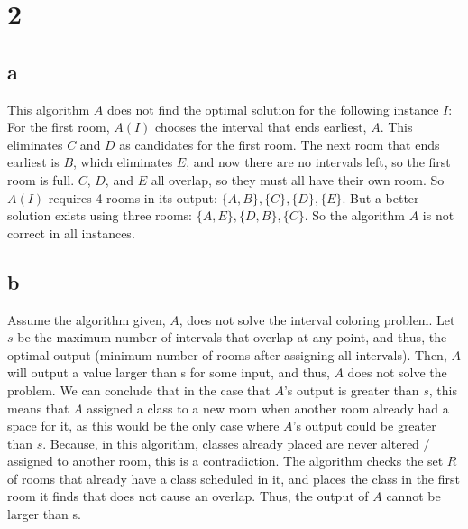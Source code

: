 \documentclass[letterpaper,notitlepage,twoside]{article}
\begin{document}
\section*{2}
\subsection*{a}
This algorithm $A$ does not find the optimal solution for the following instance $I$: For the first room, $A(I)$ chooses the interval that ends earliest, $A$. This eliminates $C$ and $D$ as candidates for the first room. The next room that ends earliest is $B$, which eliminates $E$, and now there are no intervals left, so the first room is full. $C$, $D$, and $E$ all overlap, so they must all have their own room. So $A(I)$ requires 4 rooms in its output: $\{A, B\}, \{C\}, \{D\}, \{E\}$. But a better solution exists using three rooms: $\{A, E\}, \{D, B\}, \{C\}$. So the algorithm $A$ is not correct in all instances.\
\\
\begin{center}
\end{center}

\subsection*{b}
Assume the algorithm given, $A$, does not solve the interval coloring problem. Let $s$ be the maximum number of intervals that overlap at any point, and thus, the optimal output (minimum number of rooms after assigning all intervals). Then, $A$ will output a value larger than s for some input, and thus, $A$ does not solve the problem. We can conclude that in the case that $A$'s output is greater than $s$, this means that $A$ assigned a class to a new room when another room already had a space for it, as this would be the only case where $A$'s output could be greater than $s$. Because, in this algorithm, classes already placed are never altered / assigned to another room, this is a contradiction. The algorithm checks the set $R$ of rooms that already have a class scheduled in it, and places the class in the first room it finds that does not cause an overlap. Thus, the output of $A$ cannot be larger than s. 
~\\ \par
\end{document}
